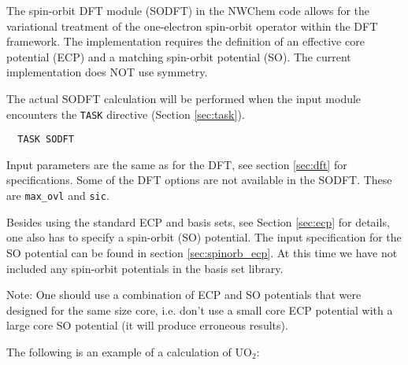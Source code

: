 %
%
\label{sec:sodft}


The spin-orbit DFT module (SODFT) in the NWChem code allows for the variational treatment
of the one-electron spin-orbit operator within the DFT framework. The implementation 
requires the definition of an effective core potential (ECP) and a matching spin-orbit
potential (SO). The current implementation does NOT use symmetry. 

The actual SODFT calculation will be performed when the input module
encounters the \verb+TASK+ directive (Section \ref{sec:task}).  

\begin{verbatim}
  TASK SODFT
\end{verbatim}

Input parameters are the same as for the DFT, see section \ref{sec:dft} for specifications. 
Some of the DFT options are not available in the SODFT. These are \verb+max_ovl+ and 
\verb+sic+.

Besides using the standard ECP and basis sets, see Section \ref{sec:ecp} for details, one 
also has to specify a spin-orbit (SO) potential. The input specification for the SO potential
can be found in section \ref{sec:spinorb_ecp}. At this time we have not included any spin-orbit
potentials in the basis set library.

Note: One should use a combination of ECP and SO potentials that were designed for the same 
size core, i.e. don't use a small core ECP potential with a large core SO potential (it will
produce erroneous results).

The following is an example of a calculation of $\mathrm{UO_2}$:

